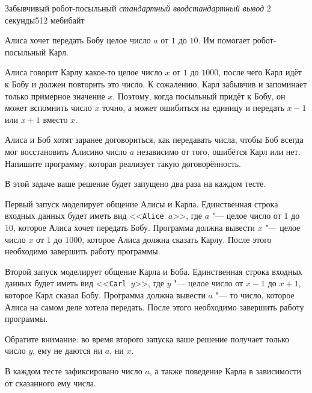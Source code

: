 \gdef\thisproblemorigin{180429p, пробный тур}
\gdef\thisproblemauthor{Иван Казменко}
\gdef\thisproblemdeveloper{Иван Казменко}
\begin{problem}{Забывчивый робот-посыльный}
{\textsl{стандартный ввод}}{\textsl{стандартный вывод}}
{2 секунды}{512 мебибайт}{}

Алиса хочет передать Бобу целое число $a$ от $1$ до $10$.
Им помогает робот-посыльный Карл.

Алиса говорит Карлу какое-то целое число $x$ от $1$ до $1000$,
после чего Карл идёт к Бобу и должен повторить это число.
К сожалению, Карл забывчив и запоминает только примерное значение $x$.
Поэтому, когда посыльный придёт к Бобу, он может вспомнить число $x$ точно,
а может ошибиться на единицу и передать $x - 1$ или $x + 1$ вместо $x$.

Алиса и Боб хотят заранее договориться, как передавать числа,
чтобы Боб всегда мог восстановить Алисино число $a$
независимо от того, ошибётся Карл или нет.
Напишите программу, которая реализует такую договорённость.

\Interaction

В этой задаче ваше решение будет запущено два раза на каждом тесте.

Первый запуск моделирует общение Алисы и Карла.
Единственная строка входных данных будет иметь вид
<<\texttt{Alice~$a$}>>, где $a$ "--- целое число от $1$ до $10$,
которое Алиса хочет передать Бобу.
Программа должна вывести $x$ "--- целое число $x$ от $1$ до $1000$,
которое Алиса должна сказать Карлу.
После этого необходимо завершить работу программы.

Второй запуск моделирует общение Карла и Боба.
Единственная строка входных данных будет иметь вид
<<\texttt{Carl~$y$}>>, где $y$ "--- целое число от $x - 1$ до $x + 1$,
которое Карл сказал Бобу.
Программа должна вывести $a$ "--- то число, которое Алиса
на самом деле хотела передать.
После этого необходимо завершить работу программы.

Обратите внимание: во время второго запуска ваше решение
получает только число $y$, ему не даются ни $a$, ни $x$.

В каждом тесте зафиксировано число $a$,
а также поведение Карла в зависимости от сказанного ему числа.

\Examples

\begin{example}
%
%
%
%
\end{example}


\end{problem}
